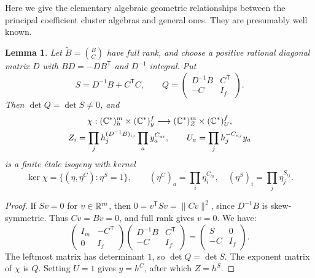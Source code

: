 \documentclass[12pt, letter]{amsart}
\newtheorem{lemma}[theorem]{Lemma}
\theoremstyle{definition}
\numberwithin{equation}{section}
\begin{document}
Here we give the elementary algebraic geometric relationships between the principal coefficient cluster algebras and general ones.  They are presumably well known.  


\begin{lemma}\label{lem:coefficient-isogeny}
Let $\widetilde B=\binom BC$ have full rank, and choose
a positive rational diagonal matrix $D$ with
$BD=-DB^{\mathsf T}$ and $D^{-1}$ integral. Put
\[
 S=D^{-1}B+C^{\mathsf T}C,\qquad
 Q=\begin{pmatrix}D^{-1}B&C^{\mathsf T}\\-C&I_f\end{pmatrix}.
\]
Then $\det Q=\det S\ne0$, and
\begin{equation}\label{eq:coefficient-isogeny}
 \begin{gathered}
 \chi:(\mathbb C^*)^m_h\times(\mathbb C^*)^f_y
          \longrightarrow(\mathbb C^*)^m_Z\times(\mathbb C^*)^f_U,\\
 Z_i=\prod_jh_j^{(D^{-1}B)_{ij}}\prod_a y_a^{C_{ai}},
 \qquad U_a=\prod_jh_j^{-C_{aj}}y_a
 \end{gathered}
\end{equation}
is a finite \'etale isogeny with kernel
\[
 \ker\chi=\{(\eta,\eta^C):\eta^S=1\},\qquad
 (\eta^C)_a=\prod_i\eta_i^{C_{ai}},\quad
 (\eta^S)_i=\prod_j\eta_j^{S_{ij}}.
\]
\end{lemma}
\begin{proof}
If $Sv=0$ for $v\in\mathbb R^m$, then
$0=v^{\mathsf T}Sv=\lVert Cv\rVert^2$, since $D^{-1}B$ is
skew-symmetric. Thus $Cv=Bv=0$, and full rank gives $v=0$.
We have:
\[
 \begin{pmatrix}I_m&-C^{\mathsf T}\\0&I_f\end{pmatrix}
 \begin{pmatrix}D^{-1}B&C^{\mathsf T}\\-C&I_f\end{pmatrix}
 =\begin{pmatrix}S&0\\-C&I_f\end{pmatrix}.
\]
The leftmost matrix has determinant $1$, so $\det Q=\det S$.
The exponent matrix of $\chi$ is $Q$.
Setting $U=1$ gives $y=h^C$, after which $Z=h^S$.
\end{proof}
\end{document}
